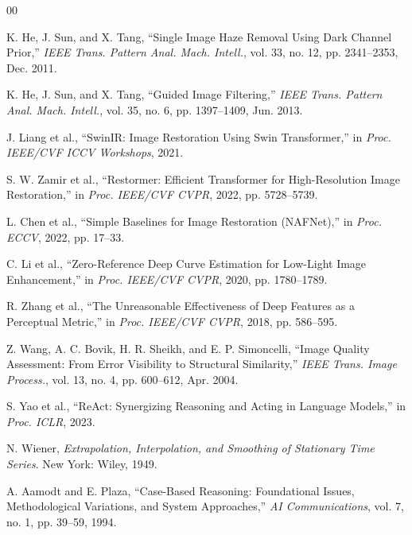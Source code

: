 \documentclass[journal, 10pt]{IEEEtran}
\begin{document}
\clearpage
\balance
\begin{thebibliography}{00}

K. He, J. Sun, and X. Tang, ``Single Image Haze Removal Using Dark Channel Prior,'' \textit{IEEE Trans. Pattern Anal. Mach. Intell.}, vol. 33, no. 12, pp. 2341--2353, Dec. 2011.

K. He, J. Sun, and X. Tang, ``Guided Image Filtering,'' \textit{IEEE Trans. Pattern Anal. Mach. Intell.}, vol. 35, no. 6, pp. 1397--1409, Jun. 2013.

J. Liang et al., ``SwinIR: Image Restoration Using Swin Transformer,'' in \textit{Proc. IEEE/CVF ICCV Workshops}, 2021.

S. W. Zamir et al., ``Restormer: Efficient Transformer for High-Resolution Image Restoration,'' in \textit{Proc. IEEE/CVF CVPR}, 2022, pp. 5728--5739.

L. Chen et al., ``Simple Baselines for Image Restoration (NAFNet),'' in \textit{Proc. ECCV}, 2022, pp. 17--33.

C. Li et al., ``Zero-Reference Deep Curve Estimation for Low-Light Image Enhancement,'' in \textit{Proc. IEEE/CVF CVPR}, 2020, pp. 1780--1789.

R. Zhang et al., ``The Unreasonable Effectiveness of Deep Features as a Perceptual Metric,'' in \textit{Proc. IEEE/CVF CVPR}, 2018, pp. 586--595.

Z. Wang, A. C. Bovik, H. R. Sheikh, and E. P. Simoncelli, ``Image Quality Assessment: From Error Visibility to Structural Similarity,'' \textit{IEEE Trans. Image Process.}, vol. 13, no. 4, pp. 600--612, Apr. 2004.

S. Yao et al., ``ReAct: Synergizing Reasoning and Acting in Language Models,'' in \textit{Proc. ICLR}, 2023.

N. Wiener, \textit{Extrapolation, Interpolation, and Smoothing of Stationary Time Series}. New York: Wiley, 1949.

A. Aamodt and E. Plaza, ``Case-Based Reasoning: Foundational Issues, Methodological Variations, and System Approaches,'' \textit{AI Communications}, vol. 7, no. 1, pp. 39--59, 1994.


\end{thebibliography}
\end{document}
